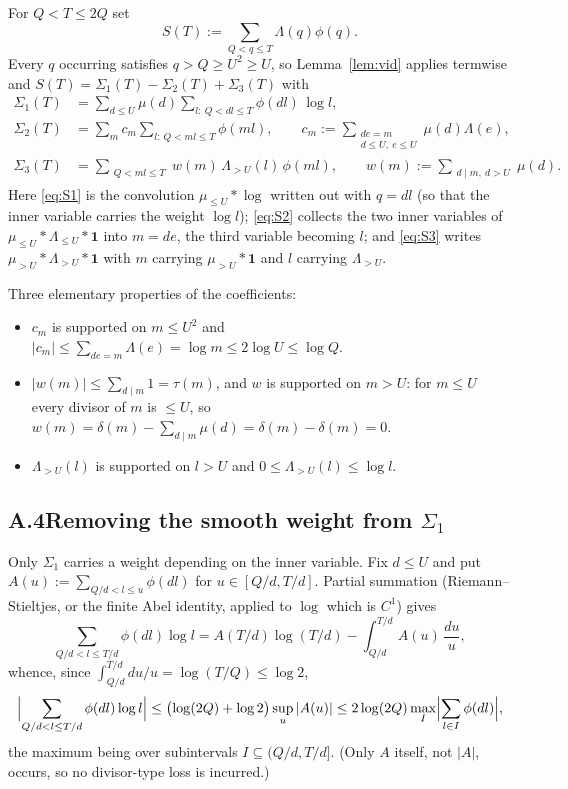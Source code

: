 \documentclass[11pt]{article}
\theoremstyle{definition}
\theoremstyle{plain}
\begin{document}
For $Q<T\le2Q$ set
\[
S(T):=\sum_{Q<q\le T}\Lambda(q)\phi(q).
\]
Every $q$ occurring satisfies $q>Q\ge U^{2}\ge U$, so Lemma~\ref{lem:vid}
applies termwise and $S(T)=\Sigma_{1}(T)-\Sigma_{2}(T)+\Sigma_{3}(T)$
with
\begin{align}
\Sigma_{1}(T)&=\sum_{d\le U}\mu(d)\!\!\sum_{l:\ Q<dl\le T}\!\!
\phi(dl)\,\log l ,\label{eq:S1}\\
\Sigma_{2}(T)&=\sum_{m}c_{m}\!\!\sum_{l:\ Q<ml\le T}\!\!\phi(ml),
\qquad c_{m}:=\!\!\sum_{\substack{de=m\\ d\le U,\ e\le U}}\!\!\mu(d)\Lambda(e),
\label{eq:S2}\\
\Sigma_{3}(T)&=\sum_{\substack{Q<ml\le T}}w(m)\,\Lambda_{>U}(l)\,\phi(ml),
\qquad w(m):=\sum_{\substack{d\mid m,\ d>U}}\mu(d).\label{eq:S3}
\end{align}
Here \eqref{eq:S1} is the convolution $\mu_{\le U}*\log$ written out with
$q=dl$ (so that the inner variable carries the weight $\log l$);
\eqref{eq:S2} collects the two inner variables of
$\mu_{\le U}*\Lambda_{\le U}*\mathbf 1$ into $m=de$, the third variable
becoming $l$; and \eqref{eq:S3} writes
$\mu_{>U}*\Lambda_{>U}*\mathbf 1$ with $m$ carrying $\mu_{>U}*\mathbf 1$
and $l$ carrying $\Lambda_{>U}$.

Three elementary properties of the coefficients:

\begin{itemize}
\item $c_{m}$ is supported on $m\le U^{2}$ and
$|c_{m}|\le\sum_{de=m}\Lambda(e)=\log m\le2\log U\le\log Q$.
\item $|w(m)|\le\sum_{d\mid m}1=\tau(m)$, and $w$ is supported on $m>U$:
for $m\le U$ every divisor of $m$ is $\le U$, so
$w(m)=\delta(m)-\sum_{d\mid m}\mu(d)=\delta(m)-\delta(m)=0$.
\item $\Lambda_{>U}(l)$ is supported on $l>U$ and
$0\le\Lambda_{>U}(l)\le\log l$.
\end{itemize}

\subsection*{A.4\quad Removing the smooth weight from $\Sigma_{1}$}

Only $\Sigma_{1}$ carries a weight depending on the inner variable.  Fix
$d\le U$ and put $A(u):=\sum_{Q/d<l\le u}\phi(dl)$ for
$u\in[Q/d,T/d]$.  Partial summation (Riemann--Stieltjes, or the finite
Abel identity, applied to $\log$ which is $C^{1}$) gives
\[
\sum_{Q/d<l\le T/d}\phi(dl)\log l
=A(T/d)\log(T/d)-\int_{Q/d}^{T/d}A(u)\,\frac{du}{u},
\]
whence, since $\int_{Q/d}^{T/d}du/u=\log(T/Q)\le\log2$,
\begin{equation}\label{eq:remove-log}
\Bigl|\sum_{Q/d<l\le T/d}\phi(dl)\log l\Bigr|
\le\bigl(\log(2Q)+\log 2\bigr)\sup_{u}|A(u)|
\le2\log(2Q)\max_{I}\Bigl|\sum_{l\in I}\phi(dl)\Bigr| ,
\end{equation}
the maximum being over subintervals $I\subseteq(Q/d,T/d]$.  (Only
$A$ itself, not $|A|$, occurs, so no divisor-type loss is incurred.)
\end{document}
